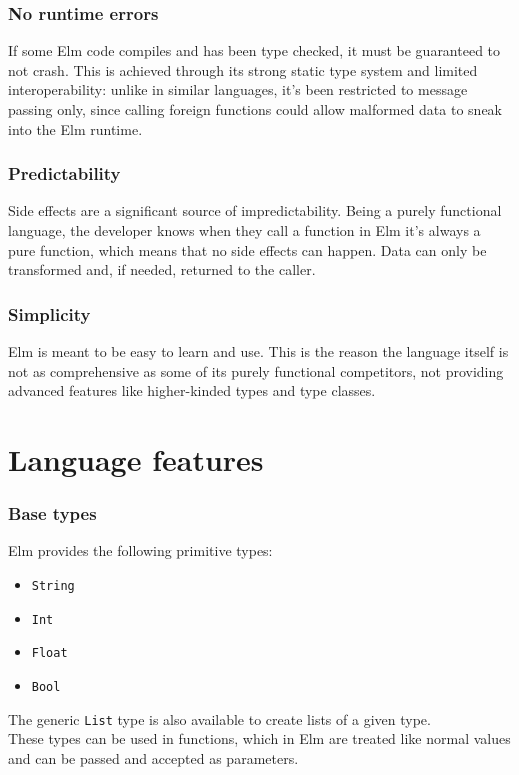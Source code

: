 \subsubsection{No runtime errors}
If some Elm code compiles and has been type checked, it must be guaranteed to not crash. This is achieved through its strong static type system and limited interoperability: unlike in similar languages, it's been restricted to message passing only, since calling foreign functions could allow malformed data to sneak into the Elm runtime.

\subsubsection{Predictability}
Side effects are a significant source of impredictability. Being a purely functional language, the developer knows when they call a function in Elm it's always a pure function, which means that no side effects can happen. Data can only be transformed and, if needed, returned to the caller.

\subsubsection{Simplicity}
Elm is meant to be easy to learn and use. This is the reason the language itself is not as comprehensive as some of its purely functional competitors, not providing advanced features like higher-kinded types and type classes.

\section{Language features}
\subsubsection{Base types}
Elm provides the following primitive types:
\begin{itemize}
    \item \texttt{String}
    \item \texttt{Int}
    \item \texttt{Float}
    \item \texttt{Bool}
\end{itemize}
The generic \texttt{List} type is also available to create lists of a given type.\\

These types can be used in functions, which in Elm are treated like normal values and can be passed and accepted as parameters.

